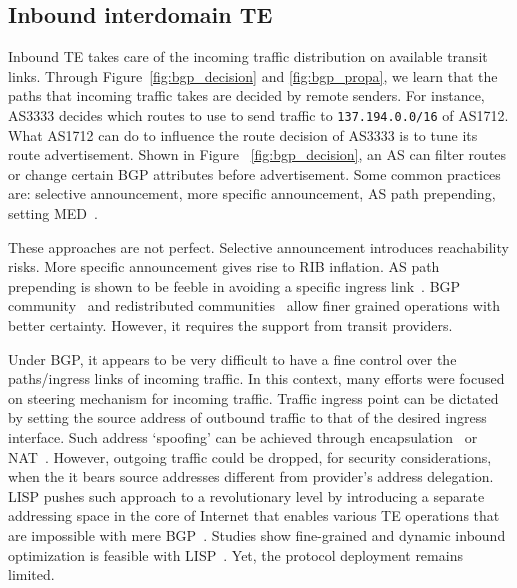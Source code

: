 \subsection{Inbound interdomain TE}
Inbound TE takes care of the incoming traffic distribution on available transit links.
Through Figure~\ref{fig:bgp_decision} and \ref{fig:bgp_propa}, we learn that the paths that incoming traffic takes are decided by remote senders.
For instance, AS3333 decides which routes to use to send traffic to \texttt{137.194.0.0/16} of AS1712.
What AS1712 can do to influence the route decision of AS3333 is to tune its route advertisement.
Shown in Figure ~\ref{fig:bgp_decision}, an AS can filter routes or change certain BGP attributes before advertisement.
Some common practices are: selective announcement, more specific announcement, AS path prepending, setting \ac{MED}~\cite{Wang2008}.

These approaches are not perfect. 
Selective announcement introduces reachability risks.
More specific announcement gives rise to \ac{RIB} inflation. 
AS path prepending is shown to be feeble in avoiding a specific ingress link~\cite{Quoitin2004a}. 
BGP community~\cite{Donnet2008, Shao2015} and redistributed communities~\cite{Quoitin2002} allow finer grained operations with better certainty. 
However, it requires the support from transit providers. 

Under BGP, it appears to be very difficult to have a fine control over the paths/ingress links of incoming traffic. 
In this context, many efforts were focused on steering mechanism for incoming traffic.
Traffic ingress point can be dictated by setting the source address of outbound traffic to that of the desired ingress interface.
Such address `spoofing' can be achieved through encapsulation~\cite{Liu2008} or \ac{NAT}~\cite{Sun2015}. However, outgoing traffic could be dropped, for security considerations, when the it bears source addresses different from provider's address delegation\cite{filtering}.
\ac{LISP} pushes such approach to a revolutionary level by introducing a separate addressing space in the core of Internet that enables various TE operations that are impossible with mere BGP~\cite{lisp}. Studies show fine-grained and dynamic inbound optimization is feasible with \ac{LISP}~\cite{Iannone2007, saucez2011mechanisms, quoitin2007evaluating}.
Yet, the protocol deployment remains limited.

